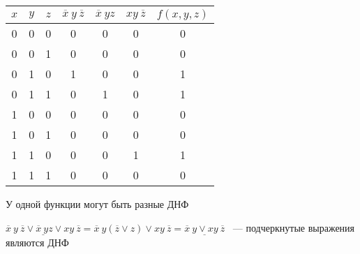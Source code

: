 \documentclass[russian]{lecture-notes}
\begin{document}
\begin{sloppypar}
        \begin{table}[h!]
            \centering
            \begin{tabular}{|c|c|c|c|c|c|c|}
                \hline
                $x$ & $y$ & $z$ & $\overline{x} \: y \: \overline{z}$ & $\overline{x} \: yz$ & $xy \: \overline{z}$ & $f(x, y, z)$ \\ \hline
                0     & 0   & 0   & 0                                   & 0                    & 0                    & 0            \\ \hline
                0     & 0   & 1   & 0                                   & 0                    & 0                    & 0            \\ \hline
                0     & 1   & 0   & 1                                   & 0                    & 0                    & 1            \\ \hline
                0     & 1   & 1   & 0                                   & 1                    & 0                    & 1            \\ \hline
                1     & 0   & 0   & 0                                   & 0                    & 0                    & 0            \\ \hline
                1     & 0   & 1   & 0                                   & 0                    & 0                    & 0            \\ \hline
                1     & 1   & 0   & 0                                   & 0                    & 1                    & 1            \\ \hline
                1     & 1   & 1   & 0                                   & 0                    & 0                    & 0            \\ \hline
            \end{tabular}
        \end{table}

        \begin{remark}
            У одной функции могут быть разные ДНФ
        \end{remark}

        \begin{example}
            $\underline{\overline{x} \: y \: \overline{z} \lor \overline{x} \: yz \lor xy \: \overline{z}} = \overline{x} \: y (\overline{z} \lor z) \lor xy \: \overline{z} = \underline{\overline{x} \: y \lor xy \: \overline{z}}$ ~--- подчеркнутые выражения являются ДНФ
        \end{example}


\end{sloppypar}
\end{document}
